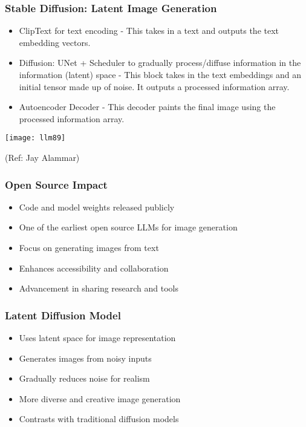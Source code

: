 \begin{frame}[fragile]\frametitle{Stable Diffusion: Latent Image Generation}
    
    \begin{itemize}
        \item ClipText for text encoding - This takes in a text and outputs the text embedding vectors.
        \item Diffusion: UNet + Scheduler to gradually process/diffuse information in the information (latent) space - This block takes in the text embeddings and an initial tensor made up of noise. It outputs a processed information array.
        \item Autoencoder Decoder - This decoder paints the final image using the processed information array.
    \end{itemize}
	
\begin{center}
\texttt{[image: llm89]}
\end{center}		

{\tiny (Ref: Jay Alammar)}
		
\end{frame}

\begin{frame}[fragile]\frametitle{Open Source Impact}
    
    \begin{itemize}
        \item Code and model weights released publicly
        \item One of the earliest open source LLMs for image generation
        \item Focus on generating images from text
        \item Enhances accessibility and collaboration
        \item Advancement in sharing research and tools
    \end{itemize}
\end{frame}

\begin{frame}[fragile]\frametitle{Latent Diffusion Model}
    
    \begin{itemize}
        \item Uses latent space for image representation
        \item Generates images from noisy inputs
        \item Gradually reduces noise for realism
        \item More diverse and creative image generation
        \item Contrasts with traditional diffusion models
    \end{itemize}
\end{frame}

